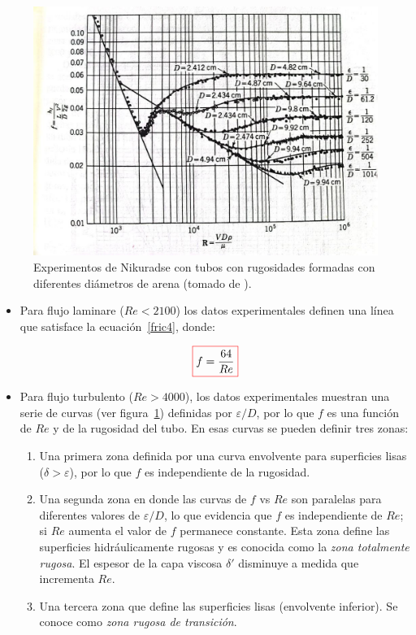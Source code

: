 \documentclass[11pt, oneside]{article}
\begin{document}
\begin{figure}[h]
\centering
\includegraphics[width=\textwidth]{nikur.jpeg}
\caption{Experimentos de Nikuradse con tubos con rugosidades formadas con diferentes di\'ametros de arena (tomado de \cite{streeter}).}
\label{nikur}
\end{figure}

\begin{itemize}
\item Para flujo laminare ($Re<2100$) los datos experimentales definen una l\'inea que satisface la ecuaci\'on~\ref{fric4}, donde: 

\begin{equation}
\color{red}\boxed{\color{black} f = \frac{64}{Re} }
\label{fric6}
\end{equation}

\item Para flujo turbulento ($Re > 4000$), los datos experimentales muestran una serie de curvas (ver figura~\ref{nikur}) definidas por $\varepsilon/D$, por lo que $f$ es una funci\'on de $Re$ y de la rugosidad del tubo. En esas curvas se pueden definir tres zonas:

\begin{enumerate}
\item Una primera zona definida por una curva envolvente para superficies lisas ($\delta > \varepsilon$), por lo que $f$ es independiente de la rugosidad.
\item Una segunda zona en donde las curvas de $f$ vs $Re$ son paralelas para diferentes valores de $\varepsilon/D$, lo que evidencia que $f$ es independiente de $Re$; si $Re$ aumenta el valor de $f$ permanece constante. Esta zona define las superficies hidr\'aulicamente rugosas y es conocida como la \emph{zona totalmente rugosa}. El espesor de la capa viscosa $\delta '$ disminuye a medida que incrementa $Re$.
\item Una tercera zona que define las superficies lisas (envolvente inferior). Se conoce como \emph{zona rugosa de transici\'on}. 
\end{enumerate}
\end{itemize}
  
\end{document}
